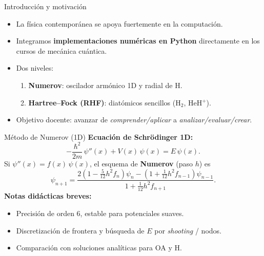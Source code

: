 \documentclass[final]{beamer}
\begin{document}
\begin{frame}[t]
  
\begin{columns}[t,totalwidth=\textwidth]

\begin{column}{0.32\textwidth}

\begin{block}{Introducción y motivación}
\begin{itemize}
  \item La física contemporánea se apoya fuertemente en la computación.
  \item Integramos \textbf{implementaciones numéricas en Python} directamente en los cursos de mecánica cuántica.
  \item Dos niveles:
  \begin{enumerate}
    \item \textbf{Numerov}: oscilador armónico 1D y radial de H.
    \item \textbf{Hartree--Fock (RHF)}: diatómicos sencillos (H$_2$, HeH$^+$).
  \end{enumerate}
  \item Objetivo docente: avanzar de \emph{comprender/aplicar} a \emph{analizar/evaluar/crear}.
\end{itemize}
\end{block}

\begin{block}{Método de Numerov (1D)}
\textbf{Ecuación de Schrödinger 1D:}
\[
  -\frac{\hbar^2}{2m}\,\psi''(x) + V(x)\,\psi(x) = E\,\psi(x).
\]
Si $\psi''(x)=f(x)\,\psi(x)$, el esquema de \textbf{Numerov} (paso $h$) es
\[
  \psi_{n+1} =
  \frac{2\!\left(1-\tfrac{5}{12}h^2 f_n\right)\psi_n -
        \left(1+\tfrac{1}{12}h^2 f_{n-1}\right)\psi_{n-1}}
       {1+\tfrac{1}{12}h^2 f_{n+1}}.
\]
\textbf{Notas didácticas breves:}
\begin{itemize}
  \item Precisión de orden 6, estable para potenciales suaves.
  \item Discretización de frontera y búsqueda de $E$ por \emph{shooting} / nodos.
  \item Comparación con soluciones analíticas para OA y H.
\end{itemize}


\end{block}
\end{column}
\end{columns}
\end{frame}
\end{document}
